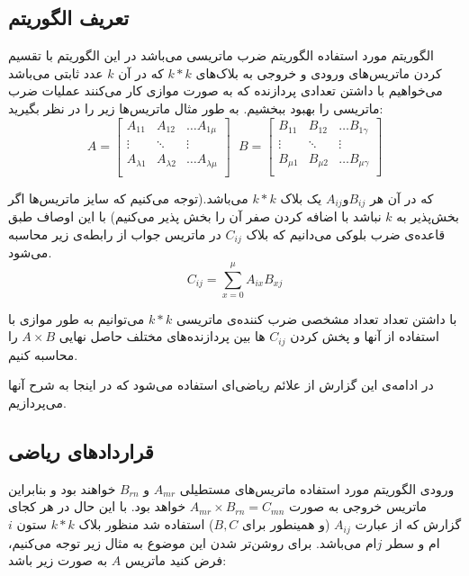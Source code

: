 \documentclass[12pt,onecolumn,a4paper,fleqn]{article}
\begin{document}
	\subsection{تعریف الگوریتم}
	الگوریتم مورد استفاده الگوریتم ضرب ماتریسی  می‌باشد در این الگوریتم با تقسیم کردن ماتریس‌های ورودی و خروجی به بلاک‌های $k*k$ که در آن $k$ عدد ثابتی می‌باشد می‌خواهیم با داشتن تعدادی پردازنده‌ که به صورت موازی کار می‌کنند عملیات ضرب ماتریسی را بهبود ببخشیم. به طور مثال ماتریس‌ها زیر را در نظر بگیرید:
	\begin{equation}
	A = \begin{bmatrix}
	A_{11}& A_{12}& \dots A_{1\mu}\\
	\vdots& \ddots& \vdots\\
	A_{\lambda1}& A_{\lambda2}& \dots A_{\lambda\mu}\\
	\end{bmatrix} 
	\ \ \, 
	B = \begin{bmatrix}
	B_{11}& B_{12}& \dots B_{1\gamma}\\
	\vdots& \ddots& \vdots\\
	B_{\mu1}& B_{\mu2}& \dots B_{\mu\gamma}\\
	\end{bmatrix} 
	\end{equation}
	
	که در آن هر $A_{ij} و B_{ij}$ یک بلاک $k*k$ می‌باشد.(توجه می‌کنیم که  سایز‌ ماتریس‌ها اگر بخش‌‌پذیر به $k$ نباشد با اضافه‌ کردن صفر آن را بخش پذیر می‌کنیم) با این اوصاف طبق قاعده‌ی ضرب بلوکی می‌دانیم که بلاک $C_{ij}$ در ماتریس جواب از رابطه‌ی زیر محاسبه می‌شود.
	\begin{equation}
	C_{ij} = \sum_{x=0}^\mu A_{ix}B_{xj}
	\label{1}
	\end{equation}
	
	با داشتن تعداد تعداد مشخصی ضرب کننده‌ی ماتریسی $k*k$ می‌توانیم  به طور موازی با استفاده از آنها  و پخش ‌کردن $C_{ij}$ ها بین پردازنده‌های مختلف حاصل نهایی $A\times B$ را محاسبه کنیم. 

در ادامه‌ی این گزارش از علائم ریاضی‌ای استفاده می‌شود که در اینجا به شرح‌ آنها می‌پردازیم.
	
\pagebreak

\subsection{قرارداد‌های ریاضی}

ورودی الگوریتم مورد استفاده  ماتریس‌های مستطیلی $A_{mr}$ و $B_{rn}$ خواهند بود و بنابراین ماتریس‌ خروجی به صورت
$A_{mr} \times B_{rn} = C_{mn}$
خواهد بود. با این‌ حال در هر کجای گزارش که از عبارت $A_{ij}$ (و همینطور برای $B,C$) استفاده شد منظور بلاک‌ $k*k$ ستون $i$ام و سطر $j$ام می‌باشد. برای روشن‌تر شدن این موضوع به مثال زیر توجه می‌کنیم، فرض کنید ماتریس $A$ به صورت زیر باشد:
\end{document}
